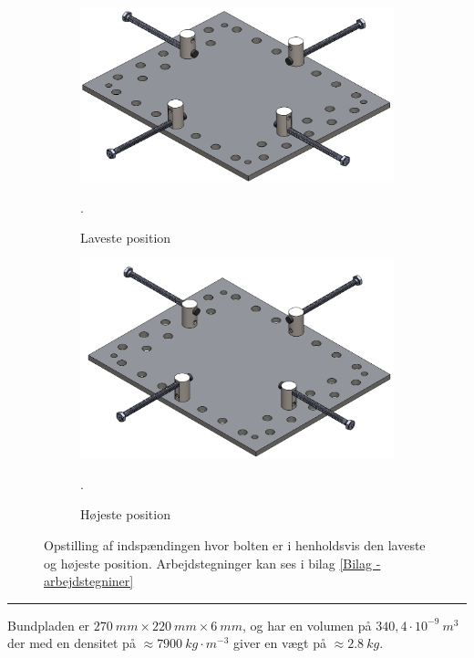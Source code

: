 \begin{figure}[H]
    \centering
    \begin{subfigure}[b]{0.48\textwidth}
    \centering
         \includegraphics[width=0.9\linewidth]{Sections/6 Detaljeløsning/Media/Indspænding lav.png}
     \caption{Laveste position}.
      \label{fig: indspænding lav}
    \end{subfigure} 
    \begin{subfigure}[b]{0.48\textwidth}
    \centering
        \includegraphics[width=0.9\linewidth]{Sections/6 Detaljeløsning/Media/Indspænding høj.png}
     \caption{Højeste position}.
      \label{fig: indspænding høj}
    \end{subfigure}
    
    \caption{Opstilling af indspændingen hvor bolten er i henholdsvis den laveste og højeste position. Arbejdstegninger kan ses i bilag \ref{Bilag - arbejdstegniner}}
    \label{fig: indspænding}
\end{figure} \plainbreak{-.5}

Bundpladen er $\SI{270}{mm} \times \SI{220}{mm} \times \SI{6}{mm}$, og har en volumen på  $ 340,4 \cdot 10^{-9} \SI{}{m^3}$ der med en densitet på $\approx \SI{7900}{kg \cdot m^{-3}}$ giver en vægt på $\approx \SI{2,8}{kg}$. 